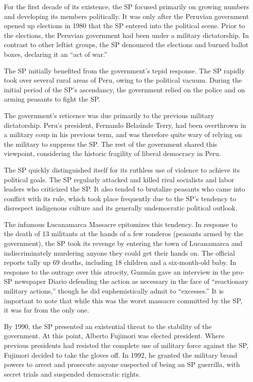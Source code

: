 For the first decade of its existence, the SP focused primarily on growing numbers and developing its members politically. It was only after the Peruvian government opened up elections in 1980 that the SP entered into the political scene. Prior to the elections, the Peruvian government had been under a military dictatorship. In contrast to other leftist groups, the SP denounced the elections and burned ballot boxes, declaring it an ``act of war.''

The SP initially benefited from the government's tepid response. The SP rapidly took over several rural areas of Peru, owing to the political vacuum. During the initial period of the SP's ascendancy, the government relied on the police and on arming peasants to fight the SP.

The government's reticence was due primarily to the previous military dictatorship. Peru's president, Fernando Bela\'{u}nde Terry, had been overthrown in a military coup in his previous term, and was therefore quite wary of relying on the military to suppress the SP. The rest of the government shared this viewpoint, considering the historic fragility of liberal democracy in Peru.

The SP quickly distinguished itself for its ruthless use of violence to achieve its political goals. The SP regularly attacked and killed rival socialists and labor leaders who criticized the SP. It also tended to brutalize peasants who came into conflict with its rule, which took place frequently due to the SP's tendency to disrespect indigenous culture and its generally undemocratic political outlook.

The infamous Lucanamarca Massacre epitomizes this tendency. In response to the death of 13 militants at the hands of a few ronderos (peasants armed by the government), the SP took its revenge by entering the town of Lucanamarca and indiscriminately murdering anyone they could get their hands on. The official reports tally up 69 deaths, including 18 children and a six-month-old baby. In response to the outrage over this atrocity, Guzm\'{a}n gave an interview in the pro-SP newspaper Diario defending the action as necessary in the face of ``reactionary military actions,'' though he did euphemistically admit to ``excesses.'' It is important to note that while this was the worst massacre committed by the SP, it was far from the only one.

By 1990, the SP presented an existential threat to the stability of the government. At this point, Alberto Fujimori was elected president. Where previous presidents had resisted the complete use of military force against the SP, Fujimori decided to take the gloves off. In 1992, he granted the military broad powers to arrest and prosecute anyone suspected of being an SP guerrilla, with secret trials and suspended democratic rights.

